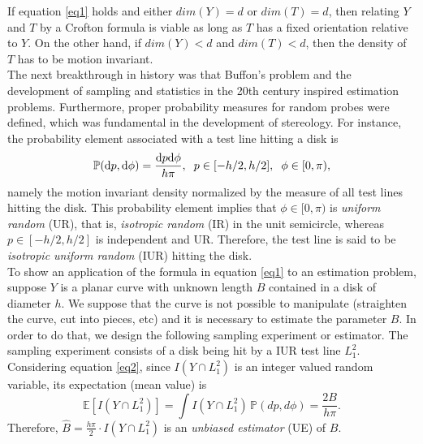 If equation \eqref{eq1} holds and either $dim(Y)=d$ or $dim(T)=d$, then relating $Y$ and $T$ by a Crofton formula is viable as long as $T$ has a fixed orientation relative to $Y$. On the other hand, if $dim(Y)<d$ and $dim(T)<d$, then the density of $T$ has to be motion invariant.\\

The next breakthrough in history was that Buffon's problem and the development of sampling and statistics in the 20th century inspired estimation problems. Furthermore, proper probability measures for random probes were defined, which was fundamental in the development of stereology. For instance, the probability element associated with a test line hitting a disk is $$ \mathbb{P}(\mathrm{d}p,\mathrm{d}\phi) = \frac{\mathrm{d}p\mathrm{d}\phi}{h\pi}, \hspace{2mm} p\in[-h/2,h/2], \hspace{2mm} \phi \in [0,\pi), $$
namely the motion invariant density normalized by the measure of all test lines hitting the disk. This probability element implies that $\phi \in [0,\pi)$ is \textit{uniform random} (UR), that is, \textit{isotropic random} (IR) in the unit semicircle, whereas $p \in [-h/2,h/2]$ is independent and UR. Therefore, the test line is said to be \textit{isotropic uniform random} (IUR) hitting the disk.\\

To show an application of the formula in equation \eqref{eq1} to an estimation problem, suppose $Y$ is a planar curve with unknown length $B$ contained in a disk of diameter $h$.  
We suppose that the curve is not possible to manipulate (straighten the curve, cut into pieces, etc) and it is necessary to estimate the parameter $B$.
In order to do that, we design the following sampling experiment or estimator.
The sampling experiment consists of a disk being hit by a IUR test line $L_1^2$. Considering equation \eqref{eq2}, since $I(Y\cap L_1^2)$ is an integer valued random variable, its expectation (mean value) is $$ \mathbb{E}[I(Y\cap L_1^2)] = \int  I(Y\cap L_1^2)\,\mathbb{P}(dp,d\phi) = \frac{2B}{h\pi}. $$
Therefore, $\widehat{B}=\frac{h\pi}{2} \cdot I(Y\cap L_1^2)$ is an \textit{unbiased estimator} (UE) of $B$.\\

